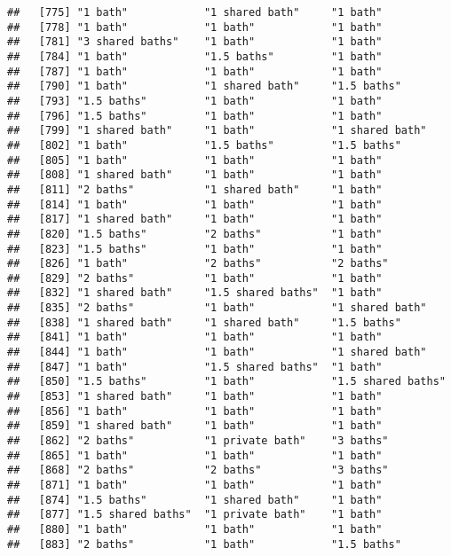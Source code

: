 \documentclass[
]{article}
\begin{document}
\begin{verbatim}
##   [775] "1 bath"            "1 shared bath"     "1 bath"           
##   [778] "1 bath"            "1 bath"            "1 bath"           
##   [781] "3 shared baths"    "1 bath"            "1 bath"           
##   [784] "1 bath"            "1.5 baths"         "1 bath"           
##   [787] "1 bath"            "1 bath"            "1 bath"           
##   [790] "1 bath"            "1 shared bath"     "1.5 baths"        
##   [793] "1.5 baths"         "1 bath"            "1 bath"           
##   [796] "1.5 baths"         "1 bath"            "1 bath"           
##   [799] "1 shared bath"     "1 bath"            "1 shared bath"    
##   [802] "1 bath"            "1.5 baths"         "1.5 baths"        
##   [805] "1 bath"            "1 bath"            "1 bath"           
##   [808] "1 shared bath"     "1 bath"            "1 bath"           
##   [811] "2 baths"           "1 shared bath"     "1 bath"           
##   [814] "1 bath"            "1 bath"            "1 bath"           
##   [817] "1 shared bath"     "1 bath"            "1 bath"           
##   [820] "1.5 baths"         "2 baths"           "1 bath"           
##   [823] "1.5 baths"         "1 bath"            "1 bath"           
##   [826] "1 bath"            "2 baths"           "2 baths"          
##   [829] "2 baths"           "1 bath"            "1 bath"           
##   [832] "1 shared bath"     "1.5 shared baths"  "1 bath"           
##   [835] "2 baths"           "1 bath"            "1 shared bath"    
##   [838] "1 shared bath"     "1 shared bath"     "1.5 baths"        
##   [841] "1 bath"            "1 bath"            "1 bath"           
##   [844] "1 bath"            "1 bath"            "1 shared bath"    
##   [847] "1 bath"            "1.5 shared baths"  "1 bath"           
##   [850] "1.5 baths"         "1 bath"            "1.5 shared baths" 
##   [853] "1 shared bath"     "1 bath"            "1 bath"           
##   [856] "1 bath"            "1 bath"            "1 bath"           
##   [859] "1 shared bath"     "1 bath"            "1 bath"           
##   [862] "2 baths"           "1 private bath"    "3 baths"          
##   [865] "1 bath"            "1 bath"            "1 bath"           
##   [868] "2 baths"           "2 baths"           "3 baths"          
##   [871] "1 bath"            "1 bath"            "1 bath"           
##   [874] "1.5 baths"         "1 shared bath"     "1 bath"           
##   [877] "1.5 shared baths"  "1 private bath"    "1 bath"           
##   [880] "1 bath"            "1 bath"            "1 bath"           
##   [883] "2 baths"           "1 bath"            "1.5 baths"        

\end{verbatim}
\end{document}
